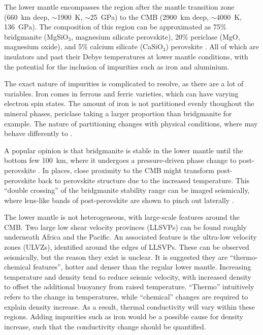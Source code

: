 The lower mantle encompasses the region after the mantle transition zone (660~km deep, $\sim$1900~K, $\sim$25~GPa) to the CMB (2900~km deep, $\sim$4000~K, 136~GPa). The composition of this region can be approximated as 75\% bridgmanite (MgSiO$_3$, magnesium silicate perovskite), 20\% periclase (MgO, magnesium oxide), and  5\% calcium silicate (CaSiO$_3$) perovskite \citep{Tronnes2009}. All of which are insulators and past their Debye temperatures at lower mantle conditions, with the potential for the inclusion of impurities such as iron and aluminium.

The exact nature of impurities is complicated to resolve, as there are a lot of variables. Iron comes in ferrous and ferric varieties, which can have varying electron spin states. The amount of iron is not partitioned evenly thoughout the mineral phases, periclase taking a larger proportion than bridgmanite for example. The nature of partitioning changes with physical conditions, where \ppvs may behave differently to \bdg.

A popular opinion is that bridgmanite is stable in the lower mantle until the bottom few 100~km, where it undergoes a pressure-driven phase change to post-perovskite \citep{Murakami2004,Oganov2004}. In places, close proximity to the CMB might transform post-perovskite back to perovskite structure due to the increased temperature. This ``double crossing'' of the bridgmanite stability range can be imaged seismically, where lens-like bands of post-perovskite are shown to pinch out laterally \citep{Lay2006}.

The lower mantle is not heterogeneous, with large-scale features around the CMB. Two large low shear velocity provinces (LLSVPs) can be found roughly underneath Africa and the Pacific. An associated feature is the ultra-low velocity zones (ULVZs), identified around the edges of LLSVPs. These can be observed seismically, but the reason they exist is unclear. It is suggested they are ``thermo-chemical features'', hotter and denser than the regular lower mantle. Increasing temperature and density tend to reduce seismic velocity, with increased density to offset the additional buoyancy from raised temperature. ``Thermo'' intuitively refers to the change in temperatures, while ``chemical'' changes are required to explain density increase. As a result, thermal conductivity will vary within these regions. Adding impurities such as iron would be a possible cause for density increase, such that the conductivity change should be quantified.

